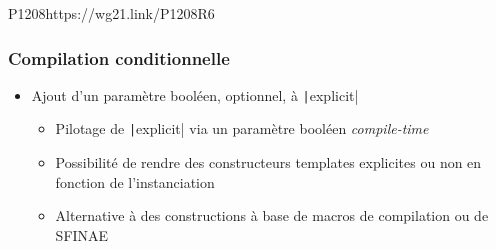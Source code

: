 \documentclass[C++.tex]{subfiles}
\begin{document}
\begin{frame}[fragile]
		{P1208}{https://wg21.link/P1208R6}
\end{frame}

\begin{frame}[fragile]
	\frametitle{Compilation conditionnelle}
	\begin{itemize}
		\item Ajout d'un paramètre booléen, optionnel, à \texttt|explicit|
		\begin{itemize}
			\item Pilotage de \texttt|explicit| via un paramètre booléen \textit{compile-time}
			\item Possibilité de rendre des constructeurs templates explicites ou non en fonction de l'instanciation
			\item Alternative à des constructions à base de macros de compilation ou de SFINAE
		\end{itemize}
	\end{itemize}

\end{frame}
\end{document}
